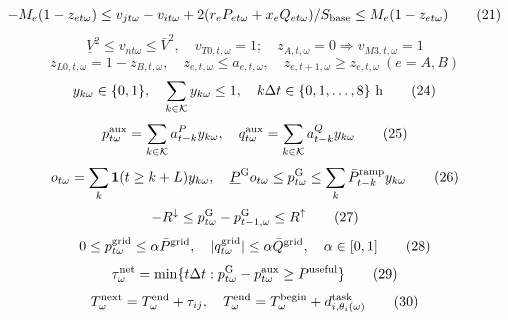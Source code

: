\documentclass[11pt]{article}
\begin{document}
\begin{equation}
-M_e(1-z_{et\omega})\le v_{jt\omega}-v_{it\omega}+2(r_eP_{et\omega}+x_eQ_{et\omega})/S_{\rm base}\le M_e(1-z_{et\omega})
\tag{21}
\end{equation}
\begin{equation}
\underline V^2\le v_{nt\omega}\le\bar V^2,\quad v_{T0,t,\omega}=1;\quad z_{A,t,\omega}=0\Rightarrow v_{M3,t,\omega}=1
\tag{22}
\end{equation}
\begin{equation}
z_{L0,t,\omega}=1-z_{B,t,\omega},\quad z_{e,t,\omega}\le a_{e,t,\omega},\quad z_{e,t+1,\omega}\ge z_{e,t,\omega}\ (e=A,B)
\tag{23}
\end{equation}
\begin{equation}
y_{k\omega}\in\{0,1\},\quad\sum_{k\in\mathcal K}y_{k\omega}\le1,\quad k\Delta t\in\{0,1,\ldots,8\}\ {\rm h}
\tag{24}
\end{equation}
\begin{equation}
p^{\rm aux}_{t\omega}=\sum_{k\in\mathcal K}a^P_{t-k}y_{k\omega},\quad q^{\rm aux}_{t\omega}=\sum_{k\in\mathcal K}a^Q_{t-k}y_{k\omega}
\tag{25}
\end{equation}
\begin{equation}
o_{t\omega}=\sum_k\mathbf1(t\ge k+L)y_{k\omega},\quad\underline P^{\rm G}o_{t\omega}\le p^{\rm G}_{t\omega}\le\sum_k\bar P_{t-k}^{\rm ramp}y_{k\omega}
\tag{26}
\end{equation}
\begin{equation}
-R^{\downarrow}\le p^{\rm G}_{t\omega}-p^{\rm G}_{t-1,\omega}\le R^{\uparrow}
\tag{27}
\end{equation}
\begin{equation}
0\le p^{\rm grid}_{t\omega}\le\alpha\bar P^{\rm grid},\quad|q^{\rm grid}_{t\omega}|\le\alpha\bar Q^{\rm grid},\quad\alpha\in[0,1]
\tag{28}
\end{equation}
\begin{equation}
\tau^{\rm net}_\omega=\min\{t\Delta t:p^{\rm G}_{t\omega}-p^{\rm aux}_{t\omega}\ge P^{\rm useful}\}
\tag{29}
\end{equation}
\begin{equation}
T^{\rm next}_{\omega}=T^{\rm end}_{\omega}+\tau_{ij},\quad T^{\rm end}_{\omega}=T^{\rm begin}_{\omega}+d^{\rm task}_{i,\theta_i(\omega)}
\tag{30}
\end{equation}
\end{document}
